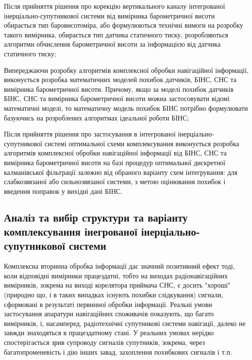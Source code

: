 Після прийняття рішення про корекцію вертикального каналу інтегрованої 
інерціально-супутникової системи від вимірника барометричної висоти обирається 
тип баровисотоміра, або формулюються технічні вимоги на розробку такого 
вимірника, обирається тип датчика статичного тиску, розробляються алгоритми 
обчислення барометричної висоти за інформацією від датчика статичного тиску;

Випереджаючи розробку алгоритмів комплексної обробки навігаційної 
інформації, виконується розробка математичних моделей похибок датчиків, 
БІНС, СНС та вимірника барометричної висоти. Причому, якщо за моделі 
похибок датчиків БІНС, СНС та вимірника барометричної висоти можна 
застосовувати відомі математичні моделі, то математичну модель похибок 
БІНС потрібно формулювати базуючись на розроблених алгоритмах ідеальної 
роботи БІНС;

Після прийняття рішення про застосування в інтегрованої інерціально-супутникової 
системі оптимальної схеми комплексування виконується розробка алгоритмів 
комплексної обробки навігаційної інформації від БІНС, СНС та вимірника 
барометричної висоти на базі процедур оптимальної дискретної калманівської 
фільтрації залежно від обраного варіанту схем інтегрування: для слабкозвязаної 
або сильнозвязаної системи, з метою оцінювання похибок і введення поправок у 
вихідні дані БІНС.
% 
% 

\subsection{Аналіз та вибір структури та варіанту комплексування інегрованої
інерціально-супутникової системи}

Комплексна вторинна обробка інформації дає значний позитивний ефект тоді, 
коли відповідні вимірники працездатні, тобто на виходах радіонавігаційних 
вимірників, зокрема на виході корелятора приймача СНС,  є досить "хороші" 
(природно що, і в таких випадках  існують похибки слідкування) сигнали, 
сформовані в результаті первинної обробки інформації. Реальні умови застосування 
апаратури навігаційних споживачів показують, що багато вимірників, і, насамперед, 
радіотехнічні супутникові системи навігації, далеко не завжди знаходяться в 
працездатному стані. У реальних умовах нерідко спостерігається зрив супроводу 
сигналів супутників, зокрема, через багатопроменевість і дію інших завад, 
захоплення похибкових сигналів і т.п.

